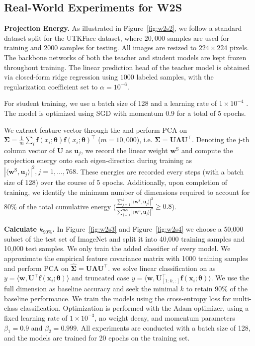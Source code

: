 \documentclass{article}
\theoremstyle{definition}
\theoremstyle{definition}
\theoremstyle{plain}
\theoremstyle{plain}
\theoremstyle{plain}
\theoremstyle{plain}
\theoremstyle{plain}
\begin{document}
\subsection{Real-World Experiments for W2S}

\textbf{Projection Energy.}
As illustrated in Figure~\ref{fig:w2s2}, we follow a standard dataset split for the UTKFace dataset, where $20{,}000$ samples are used for training and $2000$ samples for testing. All images are resized to $224 \times 224$ pixels. The backbone networks of both the teacher and student models are kept frozen throughout training. The linear prediction head of the teacher model is obtained via closed-form ridge regression using $1000$ labeled samples, with the regularization coefficient set to $\alpha = 10^{-6}$.

For student training, we use a batch size of 128 and a learning rate of $1\times 10^{-4}$
. The model is optimized using SGD with momentum 0.9 for a total of 5 epochs.

We extract feature vector through the and perform PCA on $\mathbf{\Sigma} = \frac{1}{m} \sum_{i}\mathbf{f}(x_i; \boldsymbol{\theta}) \mathbf{f}(x_i; \boldsymbol{\theta})^\top$ ($m= 10,000$), i.e. $\mathbf{\Sigma} = \mathbf{U} \mathbf{\Lambda} \mathbf{U}^\top$. Denoting the j-th column vector of $\mathbf{U}$ as $\mathbf{u}_j$, we record the linear weight $\mathbf{w}^{\mathrm{S}}$ and compute the projection energy onto each eigen-direction during training as $|\langle\mathbf{w}^{\mathrm{S}},\mathbf{u}_j\rangle|^2, j=1,\dots, 768.$ These energies are recorded every steps (with a batch size of 128) over the course of 5 epochs. Additionally, upon completion of training, we identify the minimum number of dimensions required to account for 80\% of the total cumulative energy ($\frac{\sum_{j=1}^k|\langle\mathbf{w}^{\mathrm{S}},\mathbf{u}_j\rangle|^2}{\sum_{j=1}^{768}|\langle\mathbf{w}^{\mathrm{S}},\mathbf{u}_j\rangle|^2}\geq 0.8$).

\textbf{Calculate $k_{90\%}$.}
In Figure~\ref{fig:w2s3} and Figure~\ref{fig:w2s4} we choose a 50,000 subset of the test set of ImageNet\cite{deng2009imagenet} and split it into 40,000 training samples and 10,000 test samples. We only train the added classifier of every model. We approximate the empirical feature covariance matrix with 1000 training samples and perform PCA on 
$\mathbf{\hat{\Sigma}} = \mathbf{U} \mathbf{\Lambda} \mathbf{U}^\top$. we solve linear classification on as $y = \langle \mathbf{w}, \mathbf{U}^\top \mathbf{f}(\mathbf{x}_i; \boldsymbol{\theta}) \rangle$ and truncated case $y = \langle \mathbf{w}, \mathbf{U}_{[1:k, :]}^\top \mathbf{f}(\mathbf{x}_i; \boldsymbol{\theta})\rangle$. We use the full dimension as baseline accuracy and seek the minimal $k$ to retain $90\%$ of the baseline performance. We train the models using the cross-entropy loss for multi-class classification. Optimization is performed with the Adam optimizer, using a fixed learning rate of $1\times10^{-3}$, no weight decay, and momentum parameters $\beta_1 = 0.9$ and $\beta_2 = 0.999$. All experiments are conducted with a batch size of 128, and the models are trained for 20 epochs on the training set.
\end{document}
